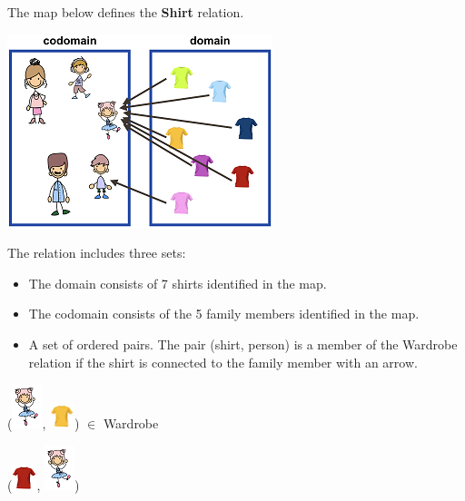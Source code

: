 \documentclass{ximera}
\begin{document}
\begin{definition}
  The map below defines the \textbf{Shirt} relation.
  
  

    \includegraphics[width=292px,height=213px]{pics/r4.png}

  
 

  The  relation includes three sets:
    \begin{itemize}
    \item The domain consists of 7 shirts identified in the map.
    \item The codomain consists of the 5 family members identified in the map.
    \item A set of ordered pairs. The pair (shirt, person) is a member of the Wardrobe relation if the shirt is connected to the family member with an arrow.
    \end{itemize}

  
\end{definition}



\begin{exercise}

 ({\includegraphics[width=33px,height=49px]{pics/elements/family/family2.png}}, {\includegraphics[width=27px,height=28px]{pics/elements/shirts/shirts2.png}}) $\in$ Wardrobe 

  \begin{multipleChoice}
  \end{multipleChoice}
  \begin{feedback}
({\includegraphics[width=27px,height=28px]{pics/elements/shirts/shirts1.png}},  {\includegraphics[width=33px,height=49px]{pics/elements/family/family2.png}})
  \end{feedback}
\end{exercise}
\end{document}
